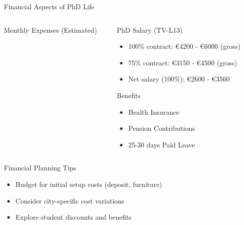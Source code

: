 \documentclass[10pt]{beamer}
\begin{document}
\begin{frame}[fragile]{Financial Aspects of PhD Life}
\begin{columns}[T]
    \begin{column}{0.5\textwidth}
        \alert{Monthly Expenses (Estimated)}
    \end{column}
    \begin{column}{0.5\textwidth}
        \alert{PhD Salary (TV-L13)}
        \begin{itemize}
            \item 100\% contract: €4200 - €6000 (gross)
            \item 75\% contract: €3150 - €4500 (gross)
            \item Net salary (100\%): €2600 - €3560
        \end{itemize}
        \alert{Benefits}
        \begin{itemize}
            \item Health Insurance
            \item Pension Contributions
            \item 25-30 days Paid Leave
        \end{itemize}
    \end{column}
\end{columns}

\vspace{0.3cm}
\alert{Financial Planning Tips}
\begin{itemize}
    \item Budget for initial setup costs (deposit, furniture)
    \item Consider city-specific cost variations
    \item Explore student discounts and benefits
\end{itemize}
\end{frame}
\end{document}
